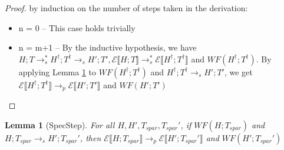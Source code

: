 \documentclass[9pt]{article}
\newtheorem{lemma}{Lemma}
\newcommand\specStep{\rightarrow_{s}}
\newcommand\parStep{\rightarrow_{p}}
\newcommand{\erase}[1]{\mathcal{E}\llbracket #1 \rrbracket}
\begin{document}
\begin{proof}
by induction on the number of steps taken in the derivation:
\begin{itemize}
\item n = 0 -- This case holds trivially
\item n = m+1 -- By the inductive hypothesis, we have $H; T \specStep^* H^\dagger; T^\dagger \specStep H'; T', \erase{H; T} \specStep^* \erase{H^\dagger; T^\dagger}$ and $WF(H^\dagger; T^\dagger)$.  By applying Lemma \ref{specStep} to $WF(H^\dagger; T^\dagger)$ and $H^\dagger; T^\dagger \specStep H'; T'$, we get
$\erase{H^\dagger; T^\dagger} \parStep \erase{H'; T'}$ and $WF(H'; T')$
\end{itemize}
\end{proof}

\begin{lemma}[SpecStep]
\label{specStep}
For all $H, H', T_{spar}, T_{spar}'$, if $WF(H; T_{spar})$ and $H; T_{spar} \specStep H'; T_{spar}'$, then $\erase{H; T_{spar}} \parStep \erase{H'; T_{spar}'}$ and $WF(H'; T_{spar}')$

\end{lemma}
\end{document}
